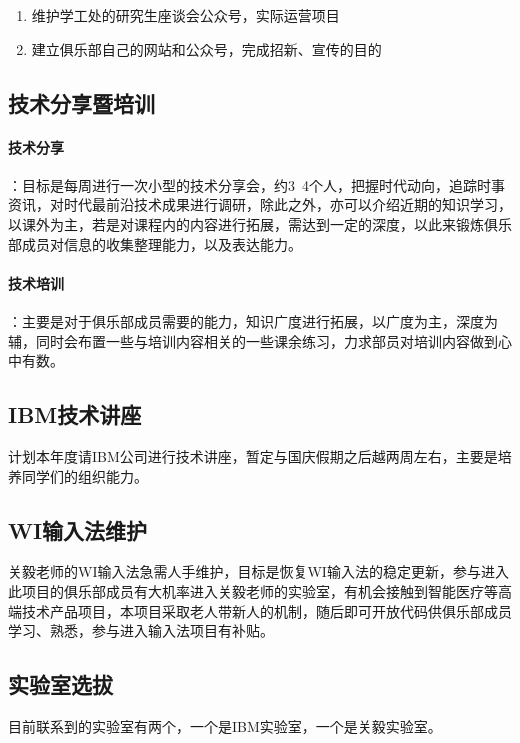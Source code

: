\documentclass{club}
\begin{document}
\begin{enumerate}
    \item 维护学工处的研究生座谈会公众号，实际运营项目
    \item 建立俱乐部自己的网站和公众号，完成招新、宣传的目的
\end{enumerate}

\subsection{技术分享暨培训}

\paragraph{技术分享}：目标是每周进行一次小型的技术分享会，约3~4个人，把握时代动向，追踪时事资讯，对时代最前沿技术成果进行调研，除此之外，亦可以介绍近期的知识学习，以课外为主，若是对课程内的内容进行拓展，需达到一定的深度，以此来锻炼俱乐部成员对信息的收集整理能力，以及表达能力。

\paragraph{技术培训}：主要是对于俱乐部成员需要的能力，知识广度进行拓展，以广度为主，深度为辅，同时会布置一些与培训内容相关的一些课余练习，力求部员对培训内容做到心中有数。

\subsection{IBM技术讲座}

计划本年度请IBM公司进行技术讲座，暂定与国庆假期之后越两周左右，主要是培养同学们的组织能力。

\subsection{WI输入法维护}

关毅老师的WI输入法急需人手维护，目标是恢复WI输入法的稳定更新，参与进入此项目的俱乐部成员有大机率进入关毅老师的实验室，有机会接触到智能医疗等高端技术产品项目，本项目采取老人带新人的机制，随后即可开放代码供俱乐部成员学习、熟悉，参与进入输入法项目有补贴。

\subsection{实验室选拔}

目前联系到的实验室有两个，一个是IBM实验室，一个是关毅实验室。
\end{document}
